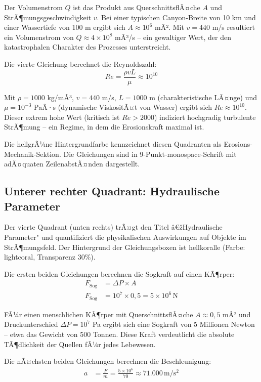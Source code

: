 ﻿\documentclass[12pt,a4paper]{report}
\begin{document}
Der Volumenstrom $Q$ ist das Produkt aus QuerschnittsflÃ¤che $A$ und StrÃ¶mungsgeschwin\-digkeit $v$. Bei einer typischen Canyon-Breite von 10 km und einer Wassertiefe von 100 m ergibt sich $A \approx 10^6$ mÂ². Mit $v = 440$ m/s resultiert ein Volumenstrom von $Q \approx 4 \times 10^8$ mÂ³/s -- ein gewaltiger Wert, der den katastrophalen Charakter des Prozesses unterstreicht.

Die vierte Gleichung berechnet die Reynoldszahl:
\begin{equation*}
	Re = \frac{\rho v L}{\mu} \approx 10^{10}
\end{equation*}

Mit $\rho = 1000$ kg/mÂ³, $v = 440$ m/s, $L = 1000$ m (charakteristische LÃ¤nge) und $\mu = 10^{-3}$ PaÂ·s (dynamische ViskositÃ¤t von Wasser) ergibt sich $Re \approx 10^{10}$. Dieser extrem hohe Wert (kritisch ist $Re > 2000$) indiziert hochgradig turbulente StrÃ¶mung -- ein Regime, in dem die Erosionskraft maximal ist.

Die hellgrÃ¼ne Hintergrundfarbe kennzeichnet diesen Quadranten als Erosions-Mechanik-Sektion. Die Gleichungen sind in 9-Punkt-monospace-Schrift mit adÃ¤quaten ZeilenabstÃ¤n\-den dargestellt.

\subsection{Unterer rechter Quadrant: Hydraulische Parameter}

Der vierte Quadrant (unten rechts) trÃ¤gt den Titel â€žHydraulische Parameter" und quantifiziert die physikalischen Auswirkungen auf Objekte im StrÃ¶mungsfeld. Der Hintergrund der Gleichungsboxen ist hellkoralle (Farbe: lightcoral, Transparenz 30\%).

Die ersten beiden Gleichungen berechnen die Sogkraft auf einen KÃ¶rper:
\begin{align*}
	F_{\mathrm{Sog}} &= \Delta P \times A \\
	F_{\mathrm{Sog}} &= 10^7 \times 0{,}5 = 5 \times 10^6 \, \mathrm{N}
\end{align*}

FÃ¼r einen menschlichen KÃ¶rper mit QuerschnittsflÃ¤che $A \approx 0{,}5$ mÂ² und Druckunterschied $\Delta P = 10^7$ Pa ergibt sich eine Sogkraft von 5 Millionen Newton -- etwa das Gewicht von 500 Tonnen. Diese Kraft verdeutlicht die absolute TÃ¶dlichkeit der Quellen fÃ¼r jedes Lebewesen.

Die nÃ¤chsten beiden Gleichungen berechnen die Beschleunigung:
\begin{align*}
	a &= \frac{F}{m} = \frac{5 \times 10^6}{70} \approx 71{.}000 \, \mathrm{m/s^2}
\end{align*}
\end{document}
